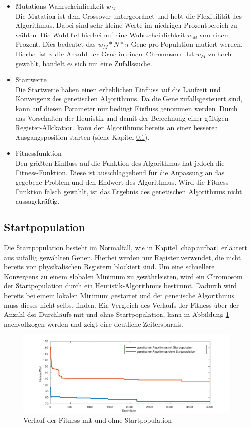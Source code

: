 \begin{itemize}
	\item Mutations-Wahrscheinlichkeit $w_M$\\
		Die Mutation ist dem Crossover untergeordnet und hebt die Flexibilität des Algorithmus. Dabei sind sehr kleine Werte im niedrigen Prozentbereich zu wählen. Die Wahl fiel hierbei auf eine Wahrscheinlichkeit $w_M$ von einem Prozent. Dies bedeutet das $w_M * N * n$ Gene pro Population mutiert werden. Hierbei ist $n$ die Anzahl der Gene in einem Chromosom. Ist $w_M$ zu hoch gewählt, handelt es sich um eine Zufallssuche.
		
	\item Startwerte\\
		Die Startwerte haben einen erheblichen Einfluss auf die Laufzeit und Konvergenz des genetischen Algorithmus. Da die Gene zufallsgesteuert sind, kann auf diesen Parameter nur bedingt Einfluss genommen werden. Durch das Vorschalten der Heuristik und damit der Berechnung einer gültigen Register-Allokation, kann der Algorithmus bereits an einer besseren Ausgangsposition starten (siehe Kapitel \ref{sub:startpop}).
	\item Fitnessfunktion\\
		Den größten Einfluss auf die Funktion des Algorithmus hat jedoch die Fitness-Funktion. Diese ist ausschlaggebend für die Anpassung an das gegebene Problem und den Endwert des Algorithmus. Wird die Fitness-Funktion falsch gewählt, ist das Ergebnis des genetischen Algorithmus nicht aussagekräftig. 
\end{itemize}
 
\subsection{Startpopulation}
\label{sub:startpop}
Die Startpopulation besteht im Normalfall, wie in Kapitel \ref{chap:aufbau} erläutert aus zufällig gewählten Genen. Hierbei werden nur Register verwendet, die nicht bereits von physikalischen Registern blockiert sind.
Um eine schnellere Konvergenz zu einem globalen Minimum zu gewährleisten, wird ein Chromosom der Startpopulation durch ein Heuristik-Algorithmus bestimmt. Dadurch wird bereits bei einem lokalen Minimum gestartet und der genetische Algorithmus muss dieses nicht selbst finden. Ein Vergleich des Verlaufs der Fitness über der Anzahl der Durchläufe mit und ohne Startpopulation, kann in Abbildung \ref{fig:startpop} nachvollzogen werden und zeigt eine deutliche Zeitersparnis.

\begin{figure}[H]
	\centering
	\includegraphics[width=\textwidth]{fig/startpop.pdf}
	\caption{Verlauf der Fitness mit und ohne Startpopulation}
	\label{fig:startpop}
\end{figure}

